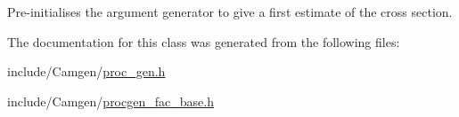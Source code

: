 Pre-\/initialises the argument generator to give a first estimate of the cross section. 



The documentation for this class was generated from the following files\+:\begin{DoxyCompactItemize}
\item 
include/\+Camgen/\hyperlink{a00730}{proc\+\_\+gen.\+h}\item 
include/\+Camgen/\hyperlink{a00734}{procgen\+\_\+fac\+\_\+base.\+h}\end{DoxyCompactItemize}
